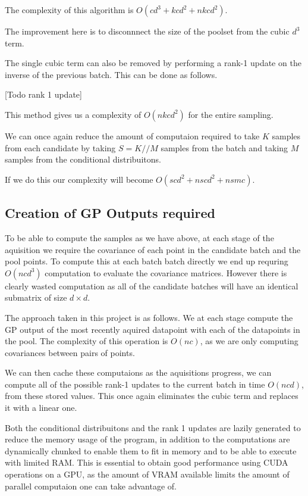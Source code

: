 \documentclass[12pt, a4paper]{report}
\theoremstyle{definition}
\begin{document}
The complexity of this algorithm is $O\left(cd^3 + kcd^2 + nkcd^2 \right)$.

The improvement here is to disconnnect the size of the poolset from the cubic $d^3$ term.

The single cubic term can also be removed by performing a rank-1 update on the inverse of the previous batch. This can be done as follows.

[Todo rank 1 update]


This method gives us a complexity of  $O\left(nkcd^2 \right)$ for the entire sampling.


We can once again reduce the amount of computaion required to take $K$ samples from each candidate by taking $S = K // M$ samples from the batch and taking $M$ samples from the conditional distribuitons.


If we do this our complexity will become $O\left(scd^2 + nscd^2 + nsmc\right)$.

\subsection{Creation of GP Outputs required}

To be able to compute the samples as we have above, at each stage of the aquisition we require the covariance of each point in the candidate batch and the pool points. To compute this at each batch batch directly we end up requring $O(ncd^3)$ computation to evaluate the covariance matrices. However there is clearly wasted computation as all of the candidate batches will have an identical submatrix of size $d \times d$.

The approach taken in this project is as follows. We at each stage compute the GP output of the most recently aquired datapoint with each of the datapoints in the pool. The complexity of this operation is $O(nc)$, as we are only computing covariances between pairs of points.

We can then cache these computaions as the aquisitions progress, we can compute all of the possible rank-1 updates to the current batch in time $O(ncd)$, from these stored values. This once again eliminates the cubic term and replaces it with a linear one.


Both the conditional distribuitons and the rank 1 updates are lazily generated to reduce the memory usage of the program, in addition to the computations are dynamically chunked to enable them to fit in memory and to be able to execute with limited RAM. This is essential to obtain good performance using CUDA operations on a GPU, as the amount of VRAM available limits the amount of parallel computaion one can take advantage of.
\end{document}
